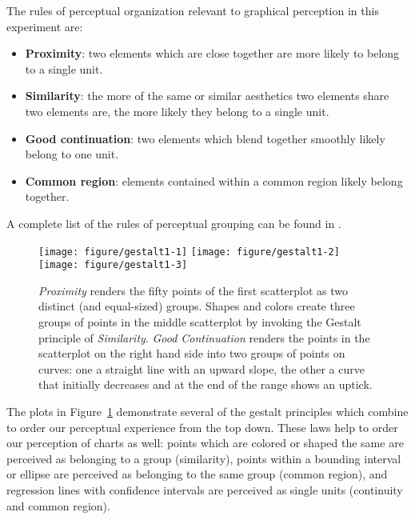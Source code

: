 \documentclass[12pt]{article}\usepackage[]{graphicx}\usepackage[]{color}
\newenvironment{knitrout}{}{} %
\begin{document}
The rules of perceptual organization relevant to graphical perception in this experiment are:
\begin{itemize}
\item \textbf{Proximity}: two elements which are close together are more likely to belong to a single unit.
\item \textbf{Similarity}: the more of the same or similar aesthetics two elements share two elements are, the more likely they belong to a single unit. 
\item \textbf{Good continuation}: two elements which blend together smoothly likely belong to one unit.
\item \textbf{Common region}: elements contained within a common region likely belong together. 
\end{itemize}
A complete list of the rules of perceptual grouping can be found in \citet{goldstein2009encyclopedia}.


\begin{figure}\centering
\begin{knitrout}
\color{fgcolor}

{\centering \texttt{[image: figure/gestalt1-1]} 
\texttt{[image: figure/gestalt1-2]} 
\texttt{[image: figure/gestalt1-3]} 

}



\end{knitrout}
\caption[Gestalt principles applied to statistical plots]{\label{fig:gestalt} \emph{Proximity} renders the fifty points of the first scatterplot as two distinct (and equal-sized) groups. Shapes and colors create three groups of points in the middle scatterplot by invoking the Gestalt principle of \emph{Similarity}. \emph{Good Continuation} renders the points in the scatterplot on the right hand side into two groups of points on curves: one a straight line with an upward slope, the other a curve that initially decreases and at the end of the range shows an uptick.} 
\end{figure}

The plots in Figure~\ref{fig:gestalt} demonstrate several of the gestalt principles which combine to order our perceptual experience from the top down. These laws help to order our perception of charts as well: points which are colored or shaped the same are perceived as belonging to a group (similarity), points within a bounding interval or ellipse are perceived as belonging to the same group (common region), and regression lines with confidence intervals are perceived as single units (continuity and common region). 
\end{document}
